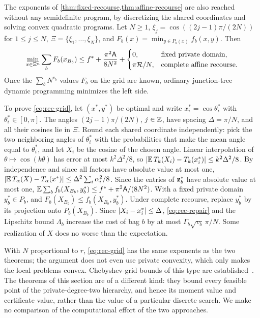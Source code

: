 \begin{remark}\label{rem:grid-baseline}
The exponents of \cref{thm:fixed-recourse,thm:affine-recourse} are also
reached without any semidefinite program, by discretizing the shared
coordinates and solving convex quadratic programs. Let $N\ge1$,
$\xi_j=\cos((2j-1)\pi/(2N))$ for $1\le j\le N$, $\Xi=\{\xi_1,\dots,\xi_N\}$,
and $F_b(x)=\min_{y\in P_b(x)}f_b(x,y)$. Then
\begin{equation}\label{eq:rec-grid}
  \min_{x\in\Xi^n}\sum_bF_b(x_{B_b})\le f^{*}+\frac{\pi^2\mathsf{A}}{8N^2}
  +\begin{cases}
      0,&\text{fixed private domain},\\
      \pi\mathcal R/N,&\text{complete affine recourse}.
    \end{cases}
\end{equation}
Once the $\sum_bN^{v_b}$ values $F_b$ on the grid are known, ordinary
junction-tree dynamic programming minimizes the left side.

To prove \eqref{eq:rec-grid}, let $(x^*,y^*)$ be optimal and write
$x^*_i=\cos\theta^*_i$ with $\theta^*_i\in[0,\pi]$. The angles
$(2j-1)\pi/(2N)$, $j\in\mathbb{Z}$, have spacing $\Delta=\pi/N$, and all their
cosines lie in $\Xi$. Round each shared coordinate independently: pick the
two neighboring angles of $\theta^*_i$ with the probabilities that make the
mean angle equal to $\theta^*_i$, and let $X_i$ be the cosine of the chosen
angle. Linear interpolation of $\theta\mapsto\cos(k\theta)$ has error at most
$k^2\Delta^2/8$, so $\lvert \mathbb E\,T_k(X_i)-T_k(x^*_i)\rvert\le k^2\Delta^2/8$.
By independence and since all factors have absolute value at most one,
$\lvert \mathbb E\,T_\alpha(X)-T_\alpha(x^*)\rvert\le\Delta^2\sum_i\alpha_i^2/8$.
Since the entries of $\mathbf{z}^*_b$ have absolute value at most one,
$\mathbb E\sum_bf_b(X_{B_b},y^*_b)\le f^{*}+\pi^2\mathsf{A}/(8N^2)$. With a fixed
private domain $y^*_b\in P_b$, and $F_b(X_{B_b})\le f_b(X_{B_b},y^*_b)$. Under
complete recourse, replace $y^*_b$ by its projection onto $P_b(X_{B_b})$.
Since $\lvert X_i-x^*_i\rvert\le\Delta$, \eqref{eq:rec-repair} and the Lipschitz
bound $\Lambda_b$ increase the cost of bag $b$ by at most
$\Gamma_b\sqrt{v_b}\,\pi/N$. Some realization of $X$ does no worse than
the expectation.

With $N$ proportional to $r$, \eqref{eq:rec-grid} has the same exponents as
the two theorems; the argument does not even use private convexity, which
only makes the local problems convex. Chebyshev-grid bounds of this type
are established~\cite{piazzon2018-chebyshev-grids}. The theorems of this
section are of a different kind: they bound every feasible point of the
private-degree-two hierarchy, and hence its moment value and certificate
value, rather than the value of a particular discrete search. We make no
comparison of the computational effort of the two approaches.
\end{remark}
